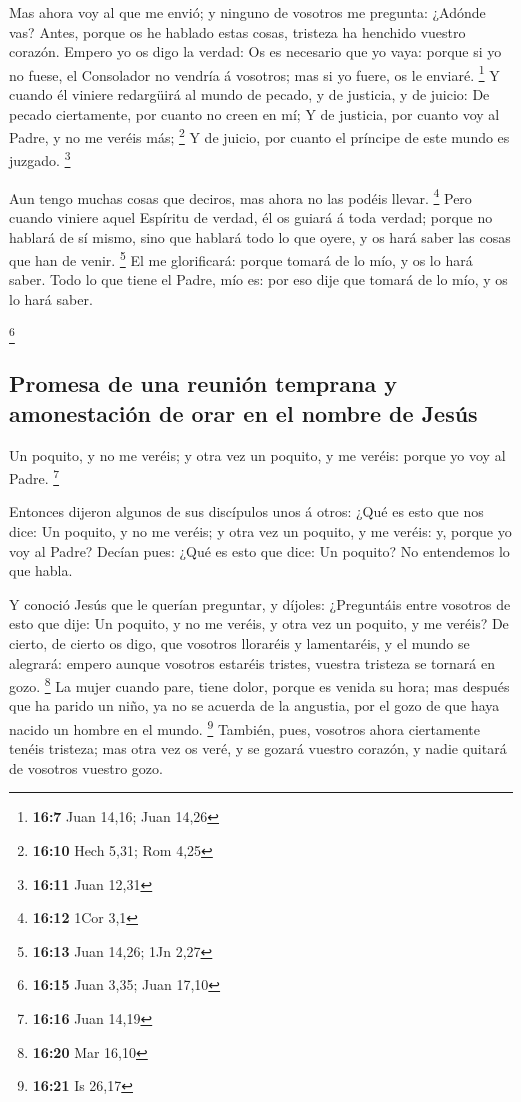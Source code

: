  Mas ahora voy al que me envió; y ninguno de vosotros me
pregunta: ¿Adónde vas?  Antes, porque os he hablado estas
cosas, tristeza ha henchido vuestro corazón.  Empero yo os
digo la verdad: Os es necesario que yo vaya: porque si yo no fuese, el
Consolador no vendría á vosotros; mas si yo fuere, os le enviaré.
\footnote{\textbf{16:7} Juan 14,16; Juan 14,26}  Y cuando él
viniere redargüirá al mundo de pecado, y de justicia, y de juicio:
 De pecado ciertamente, por cuanto no creen en mí;
 Y de justicia, por cuanto voy al Padre, y no me veréis
más; \footnote{\textbf{16:10} Hech 5,31; Rom 4,25}  Y de
juicio, por cuanto el príncipe de este mundo es juzgado. \footnote{\textbf{16:11}
  Juan 12,31}

 Aun tengo muchas cosas que deciros, mas ahora no las
podéis llevar. \footnote{\textbf{16:12} 1Cor 3,1}  Pero
cuando viniere aquel Espíritu de verdad, él os guiará á toda verdad;
porque no hablará de sí mismo, sino que hablará todo lo que oyere, y os
hará saber las cosas que han de venir. \footnote{\textbf{16:13} Juan
  14,26; 1Jn 2,27}  El me glorificará: porque tomará de lo
mío, y os lo hará saber.  Todo lo que tiene el Padre, mío
es: por eso dije que tomará de lo mío, y os lo hará saber.

\footnote{\textbf{16:15} Juan 3,35; Juan 17,10}

\hypertarget{promesa-de-una-reuniuxf3n-temprana-y-amonestaciuxf3n-de-orar-en-el-nombre-de-jesuxfas}{%
\subsection{Promesa de una reunión temprana y amonestación de orar en el
nombre de
Jesús}\label{promesa-de-una-reuniuxf3n-temprana-y-amonestaciuxf3n-de-orar-en-el-nombre-de-jesuxfas}}

 Un poquito, y no me veréis; y otra vez un poquito, y me
veréis: porque yo voy al Padre. \footnote{\textbf{16:16} Juan 14,19}

 Entonces dijeron algunos de sus discípulos unos á otros:
¿Qué es esto que nos dice: Un poquito, y no me veréis; y otra vez un
poquito, y me veréis: y, porque yo voy al Padre?  Decían
pues: ¿Qué es esto que dice: Un poquito? No entendemos lo que habla.

 Y conoció Jesús que le querían preguntar, y díjoles:
¿Preguntáis entre vosotros de esto que dije: Un poquito, y no me veréis,
y otra vez un poquito, y me veréis?  De cierto, de cierto
os digo, que vosotros lloraréis y lamentaréis, y el mundo se alegrará:
empero aunque vosotros estaréis tristes, vuestra tristeza se tornará en
gozo. \footnote{\textbf{16:20} Mar 16,10}  La mujer cuando
pare, tiene dolor, porque es venida su hora; mas después que ha parido
un niño, ya no se acuerda de la angustia, por el gozo de que haya nacido
un hombre en el mundo. \footnote{\textbf{16:21} Is 26,17} 
También, pues, vosotros ahora ciertamente tenéis tristeza; mas otra vez
os veré, y se gozará vuestro corazón, y nadie quitará de vosotros
vuestro gozo.

